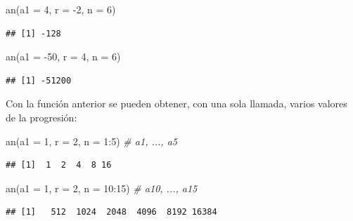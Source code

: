 \documentclass[
]{book}
\newenvironment{Shaded}{\begin{snugshade}}{\end{snugshade}}
\newcommand{\AttributeTok}[1]{\textcolor[rgb]{0.77,0.63,0.00}{#1}}
\newcommand{\CommentTok}[1]{\textcolor[rgb]{0.56,0.35,0.01}{\textit{#1}}}
\newcommand{\DecValTok}[1]{\textcolor[rgb]{0.00,0.00,0.81}{#1}}
\newcommand{\FunctionTok}[1]{\textcolor[rgb]{0.00,0.00,0.00}{#1}}
\newcommand{\NormalTok}[1]{#1}
\newcommand{\SpecialCharTok}[1]{\textcolor[rgb]{0.00,0.00,0.00}{#1}}
\theoremstyle{break}
\begin{document}
\begin{Shaded}
\begin{Highlighting}[]
\FunctionTok{an}\NormalTok{(}\AttributeTok{a1 =} \DecValTok{4}\NormalTok{, }\AttributeTok{r =} \SpecialCharTok{{-}}\DecValTok{2}\NormalTok{, }\AttributeTok{n =} \DecValTok{6}\NormalTok{)}
\end{Highlighting}
\end{Shaded}

\begin{verbatim}
## [1] -128
\end{verbatim}

\begin{Shaded}
\begin{Highlighting}[]
\FunctionTok{an}\NormalTok{(}\AttributeTok{a1 =} \SpecialCharTok{{-}}\DecValTok{50}\NormalTok{, }\AttributeTok{r =} \DecValTok{4}\NormalTok{, }\AttributeTok{n =} \DecValTok{6}\NormalTok{)}
\end{Highlighting}
\end{Shaded}

\begin{verbatim}
## [1] -51200
\end{verbatim}

Con la función anterior se pueden obtener, con una sola llamada, varios valores de
la progresión:

\begin{Shaded}
\begin{Highlighting}[]
\FunctionTok{an}\NormalTok{(}\AttributeTok{a1 =} \DecValTok{1}\NormalTok{, }\AttributeTok{r =} \DecValTok{2}\NormalTok{, }\AttributeTok{n =} \DecValTok{1}\SpecialCharTok{:}\DecValTok{5}\NormalTok{)    }\CommentTok{\# a1, ..., a5}
\end{Highlighting}
\end{Shaded}

\begin{verbatim}
## [1]  1  2  4  8 16
\end{verbatim}

\begin{Shaded}
\begin{Highlighting}[]
\FunctionTok{an}\NormalTok{(}\AttributeTok{a1 =} \DecValTok{1}\NormalTok{, }\AttributeTok{r =} \DecValTok{2}\NormalTok{, }\AttributeTok{n =} \DecValTok{10}\SpecialCharTok{:}\DecValTok{15}\NormalTok{)  }\CommentTok{\# a10, ..., a15}
\end{Highlighting}
\end{Shaded}

\begin{verbatim}
## [1]   512  1024  2048  4096  8192 16384
\end{verbatim}
\end{document}
